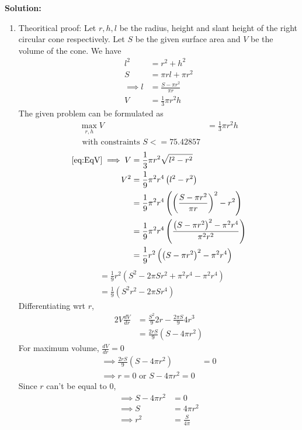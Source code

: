 \documentclass[12pt]{article}
\providecommand{\brak}[1]{\ensuremath{\left(#1\right)}}
\newcommand{\solution}{\noindent \textbf{Solution: }}
\begin{document}
\begin{enumerate}
\solution 
\begin{enumerate}
\item Theoritical proof: Let $r,h,l$ be the radius, height and slant height of the right circular cone respectively. Let $S$ be the given surface area and $V$ be the volume of the cone. We have 
\begin{align}
	l^2 &= r^2 + h^2 \\
	S &= \pi rl + \pi r^2 \\
	\implies l &= \frac{S-\pi r^2}{\pi r}\\
	\label{eq:EqV}
	V &= \frac{1}{3}\pi r^2h 
\end{align}
The given problem can be formulated as 
\begin{align}
	\max_{r,h} V &= \frac{1}{3}\pi r^2h \\
	\text { with constraints } S <= 75.42857 
\end{align}
\begin{align}
	\eqref{eq:EqV} \implies V &= \frac{1}{3}\pi r^2\sqrt{l^2-r^2} \\
	V^2 &= \frac{1}{9}\pi^2 r^4\brak{l^2-r^2} \\
	&= \frac{1}{9}\pi^2 r^4\brak{\brak{\frac{S-\pi r^2}{\pi r}}^2-r^2} \\
	&= \frac{1}{9}\pi^2 r^4\brak{\frac{\brak{S-\pi r^2}^2-\pi^2r^4 }{\pi^2 r^2}} \\
	&= \frac{1}{9} r^2\brak{\brak{S-\pi r^2}^2-\pi^2r^4 }
\end{align}
\begin{align}
	&= \frac{1}{9} r^2\brak{S^2- 2\pi S r^2 + \pi^2r^4 -\pi^2r^4 } \\
	&= \frac{1}{9} \brak{S^2r^2- 2\pi S r^4 } 
\end{align}
Differentiating wrt $r$,
\begin{align}
	2V \frac{dV}{dr} &= \frac{S^2}{9}2r - \frac{2\pi S}{9}4r^3 \\ 
	&= \frac{2rS}{9}\brak{ S- 4\pi r^2} 
\end{align}
For maximum volume, $\frac{dV}{dr} = 0$
\begin{align}
 	\implies  \frac{2rS}{9}\brak{ S- 4\pi r^2} &= 0 \\ 
	\implies r = 0 \text{ or } S - 4\pi r^2 = 0 
\end{align}
Since $r$ can't be equal to 0,
\begin{align}
	\implies S - 4\pi r^2 &= 0 \\
	\implies S &= 4\pi r^2 \\
	\implies r^2 &= \frac{S}{4\pi} \\

\end{align}
\end{enumerate}
\end{enumerate}
\end{document}
